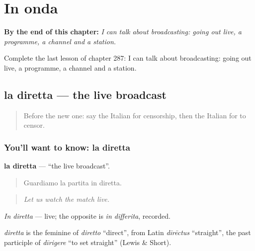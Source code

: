 
\chapter{In onda}
\label{ch:it-in-onda}

\begin{chapteropening}
\textbf{By the end of this chapter:} \emph{I can talk about broadcasting: going out live, a programme, a channel and a station.}

Complete the last lesson of chapter 287: I can talk about broadcasting: going out live, a programme, a channel and a station.
\end{chapteropening}

\section[la diretta]{la diretta — the live broadcast}

\label{lesson:IT-C287-diretta}



\begin{quote}
Before the new one: say the Italian for censorship, then the Italian for to censor.
\end{quote}

\subsection*{You'll want to know: la diretta}
\textbf{la diretta} — \textquotedblleft{}the live broadcast\textquotedblright{}.

\begin{quote}
Guardiamo la partita in diretta.
\end{quote}

\begin{quote}
\emph{Let us watch the match live.}
\end{quote}

\emph{In diretta} — live; the opposite is \emph{in differita}, recorded.

\begin{cousinweb}
\emph{diretta} is the feminine of \emph{diretto} \textquotedblleft{}direct\textquotedblright{}, from Latin \emph{dīrēctus} \textquotedblleft{}straight\textquotedblright{}, the past participle of \emph{dīrigere} \textquotedblleft{}to set straight\textquotedblright{} (Lewis \& Short).
\end{cousinweb}


